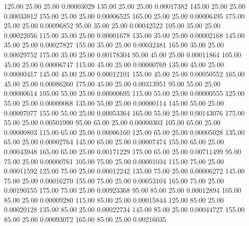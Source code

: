     125.00     25.00     25.00     0.00003029
    135.00     25.00     25.00     0.00017382
    145.00     25.00     25.00     0.00033812
    155.00     25.00     25.00     0.00006525
    165.00     25.00     25.00     0.00006495
    175.00     25.00     25.00     0.00096852
     95.00     35.00     25.00     0.00042522
    105.00     35.00     25.00     0.00022056
    115.00     35.00     25.00     0.00001678
    135.00     35.00     25.00     0.00002168
    145.00     35.00     25.00     0.00027827
    155.00     35.00     25.00     0.00032481
    165.00     35.00     25.00     0.00029752
    175.00     35.00     25.00     0.00178304
     95.00     45.00     25.00     0.00011864
    105.00     45.00     25.00     0.00006747
    115.00     45.00     25.00     0.00000769
    135.00     45.00     25.00     0.00000417
    145.00     45.00     25.00     0.00012101
    155.00     45.00     25.00     0.00050552
    165.00     45.00     25.00     0.00086260
    175.00     45.00     25.00     0.00313951
     95.00     55.00     25.00     0.00000614
    105.00     55.00     25.00     0.00000695
    115.00     55.00     25.00     0.00000555
    125.00     55.00     25.00     0.00000068
    135.00     55.00     25.00     0.00000114
    145.00     55.00     25.00     0.00007077
    155.00     55.00     25.00     0.00053364
    165.00     55.00     25.00     0.00143076
    175.00     55.00     25.00     0.00501990
     95.00     65.00     25.00     0.00000303
    105.00     65.00     25.00     0.00000803
    115.00     65.00     25.00     0.00006160
    125.00     65.00     25.00     0.00005028
    135.00     65.00     25.00     0.00002764
    145.00     65.00     25.00     0.00007474
    155.00     65.00     25.00     0.00043948
    165.00     65.00     25.00     0.00171229
    175.00     65.00     25.00     0.00711499
     95.00     75.00     25.00     0.00000761
    105.00     75.00     25.00     0.00001034
    115.00     75.00     25.00     0.00011592
    125.00     75.00     25.00     0.00012242
    135.00     75.00     25.00     0.00006272
    145.00     75.00     25.00     0.00016270
    155.00     75.00     25.00     0.00053104
    165.00     75.00     25.00     0.00190155
    175.00     75.00     25.00     0.00923368
     95.00     85.00     25.00     0.00012894
    105.00     85.00     25.00     0.00009280
    115.00     85.00     25.00     0.00015844
    125.00     85.00     25.00     0.00020128
    135.00     85.00     25.00     0.00022734
    145.00     85.00     25.00     0.00044727
    155.00     85.00     25.00     0.00093072
    165.00     85.00     25.00     0.00216035

